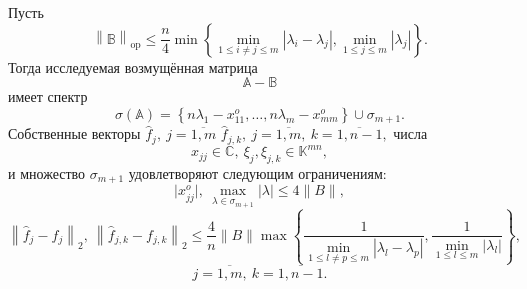 \begin{ksvthm}
    Пусть
    \[
        \left\| \mathbb{B} \right\|_{\mathrm{op}}
        \leq 
        \frac{n}{4}
         \min\left\{
             \min\limits_{1\leq i{\neq}j \leq m }{|\lambda_i - \lambda_j|},
             \min\limits_{1\leq j \leq m}{|\lambda_j|}
         \right\}.
        \]
    Тогда исследуемая возмущённая матрица
    \[
        \mathbb{A} - \mathbb{B}
        \]
    имеет спектр
    \[
        \sigma\left(\mathbb{A}\right) =
        \left\{
            n\lambda_1 - x_{11}^o, \ldots, n\lambda_m - x_{mm}^o
        \right\}
        \cup \sigma_{m{+}1}.
        \]
    Собственные векторы
    \(
        \hat{f}_j,
        \ j{=}\overline{1,m}
        \)
    \(
        \hat{f}_{j,k},
        \ j{=}\overline{1,m},
        \ k{=}\overline{1,n{-}1},
        \)
    числа
    \[
        x_{jj}{\in}\mathbb{C},
        \ \xi_j, \xi_{j,k}{\in}\mathbb{K}^{mn},
        \]
    и множество \( \sigma_{m{+}1} \)
    удовлетворяют следующим ограничениям:
\[
    \lvert x_{jj}^o\rvert,
    \ \max_{\lambda\in\sigma_{m{+}1}} \lvert\lambda\rvert
    \leq 4\|B\|,
\]
\[
    \left\| \hat{f}_j - f_j \right\|_2,
    \ \left\| \hat{f}_{j,k} - f_{j,k}\right\|_2
    \leq
    \frac4n \|B\|
         \max\left\{
         \frac{1}{
             \min\limits_{1\leq l{\neq}p \leq m }{|\lambda_l - \lambda_p|}},
         \frac{1}{
             \min\limits_{1\leq l \leq m}{|\lambda_l|}}
         \right\},
\]
    \[
        j{=}\overline{1,m},
        \ k{=}\overline{1,n{-}1}.
        \]
\end{ksvthm}
